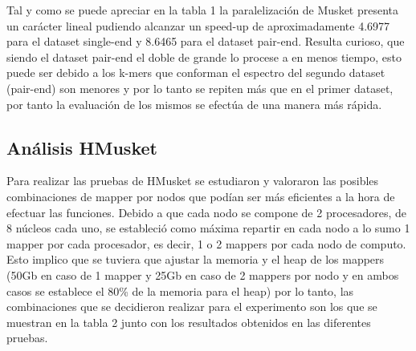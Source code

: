 \documentclass[conference]{IEEEtran}
\begin{document}
Tal y como se puede apreciar en la tabla 1 la paralelización de Musket presenta un carácter lineal pudiendo alcanzar un speed-up de aproximadamente 4.6977 para el dataset single-end y 8.6465 para el dataset pair-end. Resulta curioso, que siendo el dataset pair-end el doble de grande lo procese a en menos tiempo, esto puede ser debido a los k-mers que conforman el espectro del segundo dataset (pair-end) son menores y por lo tanto se repiten más que en el primer dataset, por tanto la evaluación de los mismos se efectúa de una manera más rápida.


\subsection{Análisis HMusket}
Para realizar las pruebas de HMusket se estudiaron y valoraron las posibles combinaciones de mapper por nodos que podían ser más eficientes a la hora de efectuar las funciones. Debido a que cada nodo se compone de 2 procesadores, de 8 núcleos cada uno, se estableció como máxima repartir en cada nodo a lo sumo 1 mapper por cada procesador, es decir, 1 o 2 mappers por cada nodo de computo. Esto implico que se tuviera que ajustar la memoria y el heap de los mappers (50Gb en caso de 1 mapper y 25Gb en caso de 2 mappers por nodo y en ambos casos se establece el 80\% de la memoria para el heap) por lo tanto, las combinaciones que se decidieron realizar para el experimento son los que se muestran en la tabla 2 junto con los resultados obtenidos en las diferentes pruebas.\\
\end{document}
